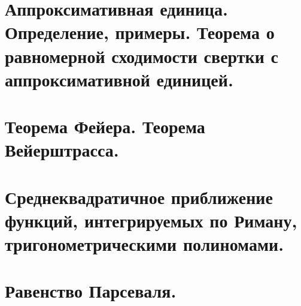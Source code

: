 \documentclass[matan, 12pt, fleqn]{subfiles}
\begin{document}
\newpage
\section{Аппроксимативная единица. Определение, примеры. Теорема о равномерной сходимости свертки с аппроксимативной единицей.}


\newpage
\section{Теорема Фейера. Теорема Вейерштрасса.}


\newpage
\section{Среднеквадратичное приближение функций, интегрируемых по Риману, тригонометрическими полиномами.}


\newpage
\section{Равенство Парсеваля.}
\end{document}
